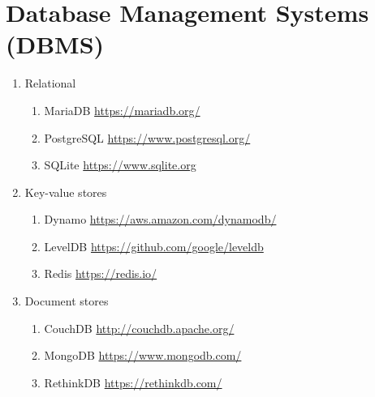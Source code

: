 \documentclass{textile}
\begin{document}
\onecolumn
\section{Database Management Systems (DBMS)} \label{appx:DBMS} 

\begin{enumerate}
	\item Relational
    \begin{enumerate}
        \item MariaDB \url{https://mariadb.org/}
    	\item PostgreSQL \url{https://www.postgresql.org/}
        \item SQLite \url{https://www.sqlite.org}
    \end{enumerate}
    \item Key-value stores
    \begin{enumerate}
        \item Dynamo \url{https://aws.amazon.com/dynamodb/}
    	\item LevelDB \url{https://github.com/google/leveldb}
        \item Redis \url{https://redis.io/}
    \end{enumerate}
    \item Document stores
    \begin{enumerate}
        \item CouchDB \url{http://couchdb.apache.org/}
    	\item MongoDB \url{https://www.mongodb.com/}
        \item RethinkDB \url{https://rethinkdb.com/}
    \end{enumerate}
\end{enumerate} 
\end{document}
